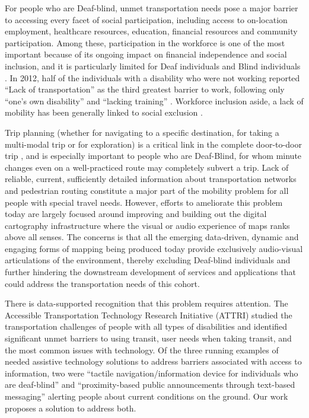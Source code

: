 For people who are Deaf-blind, unmet transportation needs pose a major barrier to accessing every facet of social participation, including access to on-location employment, healthcare resources, education, financial resources and community participation. 
Among these, participation in the workforce is one of the most important because of its ongoing impact on financial independence and social inclusion, and it is particularly limited for Deaf individuals and Blind individuals \cite{zwerling2002workforce}.  
In 2012, half of the individuals with a disability who were not working reported ``Lack of transportation'' as the third greatest barrier to work, following only ``one's own disability'' and ``lacking training'' \cite{BLS}.
Workforce inclusion aside, a lack of mobility has been generally linked to social exclusion \cite{kenyon2002transport}.



Trip planning (whether for navigating to a specific destination, for taking a multi-modal trip or for exploration) is a critical link in the complete door-to-door trip \cite{AttriCompleteTrip}, and is especially important to people who are Deaf-Blind, for whom minute changes even on a well-practiced route may completely subvert a trip.  Lack of reliable, current, sufficiently detailed information about transportation networks and pedestrian routing constitute a major part of the mobility problem for all people with special travel needs. However, efforts to ameliorate this problem today are largely focused around improving and building out the digital cartography infrastructure where the visual or audio experience of maps ranks above all senses. The concerns is that all the emerging data-driven, dynamic and engaging forms of mapping being produced today provide exclusively audio-visual articulations of the environment, thereby excluding Deaf-blind individuals and further hindering the downstream development of services and applications that could address the transportation needs of this cohort. 

There is data-supported recognition that this problem requires attention.
The Accessible Transportation Technology Research Initiative (ATTRI) studied the transportation challenges of people with all types of disabilities and identified significant unmet barriers to using transit, user needs when taking transit, and the most common issues with technology.
Of the three running examples of needed assistive technology solutions to address barriers associated with access to information, two were 
``tactile navigation/information device for individuals who are deaf-blind'' and ``proximity-based public announcements through text-based messaging'' alerting people about current conditions on the ground. Our work proposes a solution to address both.


